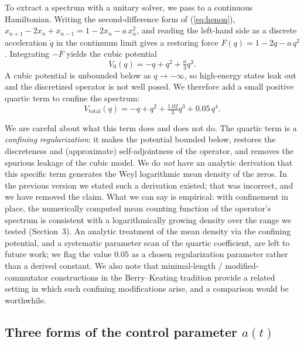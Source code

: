 \documentclass[utf8]{FrontiersinHarvard}
\begin{document}
To extract a spectrum with a unitary solver, we pass to a continuous Hamiltonian. Writing the second-difference form of (\ref{eq:henon}), $x_{n+1} - 2x_n + x_{n-1} = 1 - 2x_n - a\,x_n^2$, and reading the left-hand side as a discrete acceleration $\ddot{q}$ in the continuum limit gives a restoring force $F(q) = 1 - 2q - a\,q^2$. Integrating $-F$ yields the cubic potential
\begin{equation}
V_0(q) = -q + q^2 + \tfrac{a}{3}q^3.
\label{eq:v0}
\end{equation}
A cubic potential is unbounded below as $q\to-\infty$, so high-energy states leak out and the discretized operator is not well posed. We therefore add a small positive quartic term to confine the spectrum:
\begin{equation}
V_{\mathrm{total}}(q) = -q + q^2 + \tfrac{1.02}{3}q^3 + 0.05\,q^4.
\label{eq:vtotal}
\end{equation}

We are careful about what this term does and does not do. The quartic term is a \emph{confining regularization}: it makes the potential bounded below, restores the discreteness and (approximate) self-adjointness of the operator, and removes the spurious leakage of the cubic model. We do \emph{not} have an analytic derivation that this specific term generates the Weyl logarithmic mean density of the zeros. In the previous version we stated such a derivation existed; that was incorrect, and we have removed the claim. What we can say is empirical: with confinement in place, the numerically computed mean counting function of the operator's spectrum is consistent with a logarithmically growing density over the range we tested (Section~3). An analytic treatment of the mean density via the confining potential, and a systematic parameter scan of the quartic coefficient, are left to future work; we flag the value $0.05$ as a chosen regularization parameter rather than a derived constant. We also note that minimal-length / modified-commutator constructions in the Berry--Keating tradition \citep{bishop2019} provide a related setting in which such confining modifications arise, and a comparison would be worthwhile.

\subsection{Three forms of the control parameter $a(t)$}
\end{document}
